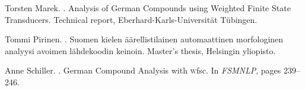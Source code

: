 \documentclass[postprint]{flammie}
\begin{document}
\begin{thebibliography}{14}
Torsten Marek.
.
\newblock Analysis of German Compounds using Weighted Finite State Transducers.
\newblock Technical report, Eberhard-Karls-Universität Tübingen.

Tommi Pirinen.
.
\newblock Suomen kielen äärellistilainen automaattinen morfologinen
  analyysi avoimen lähdekoodin keinoin.
\newblock Master's thesis, Helsingin yliopisto.

Anne Schiller.
.
\newblock German Compound Analysis with {\textsc wfsc}.
\newblock In {\em FSMNLP}, pages 239--246.


\end{thebibliography}
\end{document}
